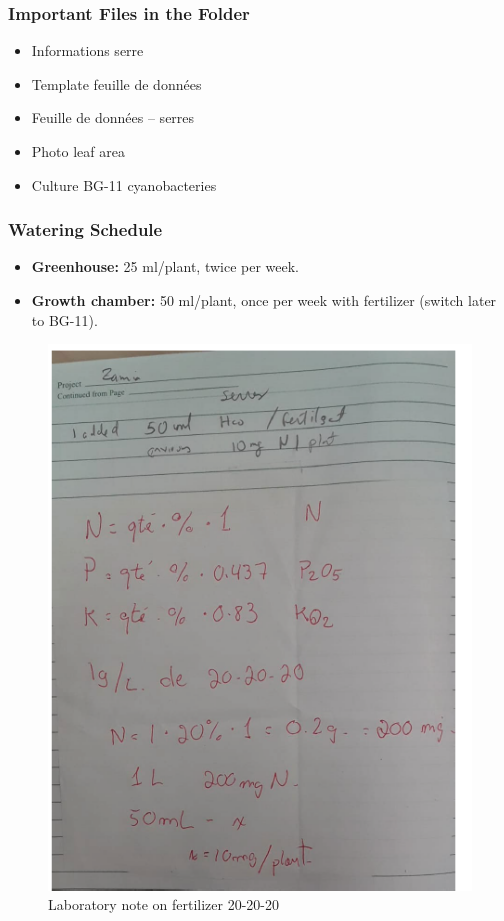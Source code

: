 \documentclass[
  11pt,
]{article}
\providecommand{\tightlist}{%
  \setlength{\itemsep}{0pt}\setlength{\parskip}{0pt}}
\begin{document}
\subsubsection{Important Files in the
Folder}\label{important-files-in-the-folder}

\begin{itemize}
\tightlist
\item
  Informations serre\\
\item
  Template feuille de données\\
\item
  Feuille de données -- serres\\
\item
  Photo leaf area\\
\item
  Culture BG-11 cyanobacteries
\end{itemize}

\subsubsection{Watering Schedule}\label{watering-schedule}

\begin{itemize}
\tightlist
\item
  \textbf{Greenhouse:} 25 ml/plant, twice per week.\\
\item
  \textbf{Growth chamber:} 50 ml/plant, once per week with fertilizer
  (switch later to BG-11).
\end{itemize}

\begin{figure}

{\centering \includegraphics[width=0.7\linewidth]{Figuras/202020} 

}

\caption{Laboratory note on fertilizer 20-20-20}\label{fig:fert2020_img}
\end{figure}
\end{document}
